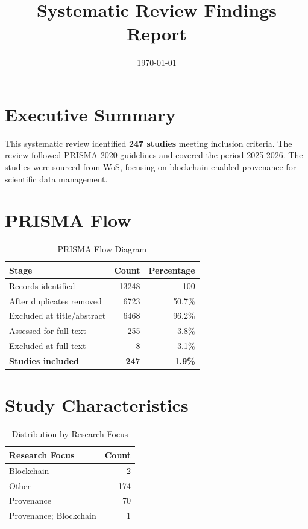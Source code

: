 \documentclass{article}
\title{
Systematic Review Findings Report
}
\date{\today}
\begin{document}
\maketitle

\section{Executive Summary}

This systematic review identified \textbf{247 studies} meeting inclusion criteria. 
The review followed PRISMA 2020 guidelines and covered the period 2025-2026. 
The studies were sourced from WoS, focusing on blockchain-enabled provenance for scientific data management.

\section{PRISMA Flow}

\begin{table}[htbp]
\centering
\caption{PRISMA Flow Diagram}
\begin{tabular}{lrr}
\toprule
Stage & Count & Percentage \\
\midrule
Records identified & 13248 & 100\\%
After duplicates removed & 6723 & 50.7\% \\
Excluded at title/abstract & 6468 & 96.2\% \\
Assessed for full-text & 255 & 3.8\% \\
Excluded at full-text & 8 & 3.1\% \\
\textbf{Studies included} & \textbf{247} & \textbf{1.9\%} \\
\bottomrule
\end{tabular}
\end{table}

\section{Study Characteristics}

\begin{table}[htbp]
\centering
\caption{Distribution by Research Focus}
\begin{tabular}{lr}
\toprule
Research Focus & Count \\
\midrule
Blockchain & 2 \\
Other & 174 \\
Provenance & 70 \\
Provenance; Blockchain & 1 \\
\bottomrule
\end{tabular}
\end{table}
\end{document}
